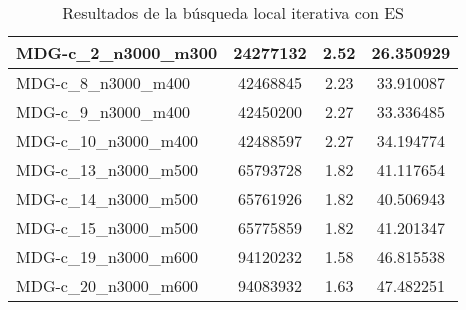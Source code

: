 \documentclass[11pt,a4paper]{article}
\begin{document}
\begin{table}[H]
\begin{center}
\begin{tabular}{|l|c|c|c|}
					MDG-c\_2\_n3000\_m300 & 24277132 & 2.52 & 26.350929 \\ \hline
					MDG-c\_8\_n3000\_m400 & 42468845 & 2.23 & 33.910087 \\ \hline
					MDG-c\_9\_n3000\_m400 & 42450200 & 2.27 & 33.336485 \\ \hline
					MDG-c\_10\_n3000\_m400 & 42488597 & 2.27 & 34.194774 \\ \hline
					MDG-c\_13\_n3000\_m500 & 65793728 & 1.82 & 41.117654 \\ \hline
					MDG-c\_14\_n3000\_m500 & 65761926 & 1.82 & 40.506943 \\ \hline
					MDG-c\_15\_n3000\_m500 & 65775859 & 1.82 & 41.201347 \\ \hline
					MDG-c\_19\_n3000\_m600 & 94120232 & 1.58 & 46.815538 \\ \hline
					MDG-c\_20\_n3000\_m600 & 94083932 & 1.63 & 47.482251 \\ \hline
				\end{tabular}
							\end{center}
				\caption{Resultados de la búsqueda local iterativa con ES}
				\label{}
			\end{table}
			
\end{document}
